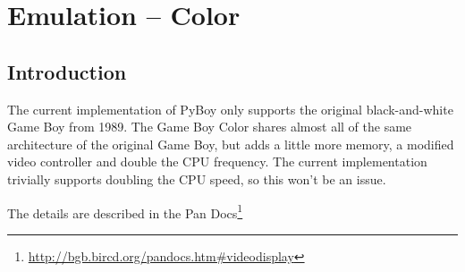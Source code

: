 \documentclass[11pt]{report} %
\author{Mads Ynddal}
\begin{document}
\onecolumn

\chapter*{Emulation -- Color}
\section*{Introduction}
The current implementation of PyBoy only supports the original black-and-white Game Boy from 1989. The Game Boy Color shares almost all of the same architecture of the original Game Boy, but adds a little more memory, a modified video controller and double the CPU frequency. The current implementation trivially supports doubling the CPU speed, so this won't be an issue.

The details are described in the Pan Docs\footnote{\url{http://bgb.bircd.org/pandocs.htm#videodisplay}}
\end{document}
